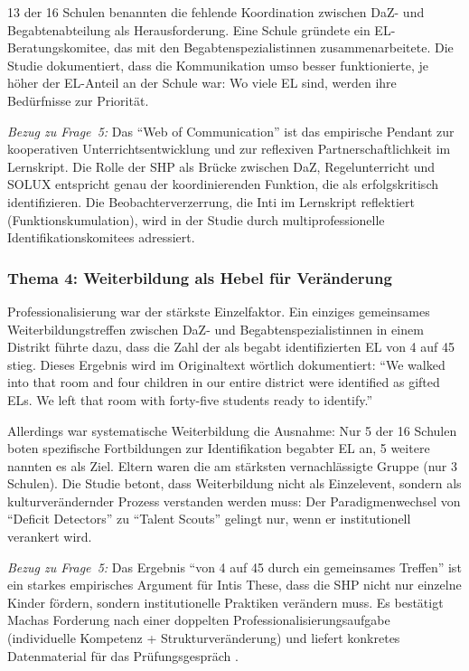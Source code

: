 \documentclass[ngerman, a4paper]{article}
\begin{document}
13 der 16 Schulen benannten die fehlende Koordination zwischen DaZ- und
Begabtenabteilung als Herausforderung. Eine Schule gründete ein
EL-Beratungskomitee, das mit den Begabtenspezialistinnen
zusammenarbeitete. Die Studie dokumentiert, dass die Kommunikation umso
besser funktionierte, je höher der EL-Anteil an der Schule war: Wo viele
EL sind, werden ihre Bedürfnisse zur Priorität.

\textit{Bezug zu Frage~5:} Das \enquote{Web of Communication} ist das
empirische Pendant zur kooperativen Unterrichtsentwicklung
\parencite{buholzer2010allegleich} und zur reflexiven
Partnerschaftlichkeit im Lernskript. Die Rolle der SHP als Brücke
zwischen DaZ, Regelunterricht und SOLUX entspricht genau der
koordinierenden Funktion, die \textcite{gubbins2020promising} als
erfolgskritisch identifizieren. Die Beobachterverzerrung, die Inti im
Lernskript reflektiert (Funktionskumulation), wird in der Studie durch
multiprofessionelle Identifikationskomitees adressiert.

\subsubsection*{Thema 4: Weiterbildung als Hebel für Veränderung}

Professionalisierung war der stärkste Einzelfaktor. Ein einziges
gemeinsames Weiterbildungstreffen zwischen DaZ- und
Begabtenspezialistinnen in einem Distrikt führte dazu, dass die Zahl der
als begabt identifizierten EL von 4 auf 45 stieg. Dieses Ergebnis wird im
Originaltext wörtlich dokumentiert: \enquote{We walked into that room and
four children in our entire district were identified as gifted ELs. We
left that room with forty-five students ready to identify.}

Allerdings war systematische Weiterbildung die Ausnahme: Nur 5 der 16
Schulen boten spezifische Fortbildungen zur Identifikation begabter EL an,
5 weitere nannten es als Ziel. Eltern waren die am stärksten
vernachlässigte Gruppe (nur 3 Schulen). Die Studie betont, dass
Weiterbildung nicht als Einzelevent, sondern als kulturverändernder
Prozess verstanden werden muss: Der Paradigmenwechsel von \enquote{Deficit
Detectors} zu \enquote{Talent Scouts} gelingt nur, wenn er institutionell
verankert wird.

\textit{Bezug zu Frage~5:} Das Ergebnis \enquote{von 4 auf 45 durch ein
gemeinsames Treffen} ist ein starkes empirisches Argument für Intis These,
dass die SHP nicht nur einzelne Kinder fördern, sondern institutionelle
Praktiken verändern muss. Es bestätigt Machas Forderung nach einer
doppelten Professionalisierungsaufgabe (individuelle Kompetenz +
Strukturveränderung) und liefert konkretes Datenmaterial für das
Prüfungsgespräch \parencite[S.\,161,\,163\psq]{macha2019gender}.
\end{document}
